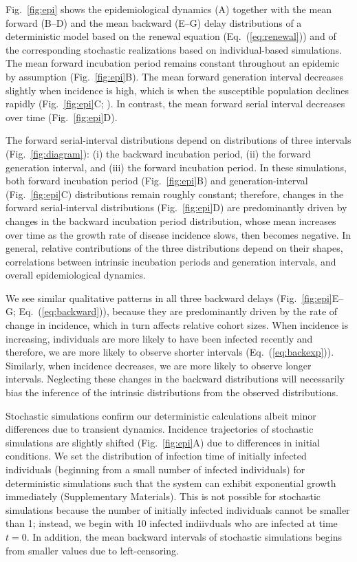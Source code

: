 \documentclass[12pt]{article}
\newcommand{\eref}[1]{Eq.~(\ref{eq:#1})}
\newcommand{\fref}[1]{Fig.~\ref{fig:#1}}
\begin{document}
\fref{epi} shows the epidemiological dynamics (A) together with the mean forward (B--D) and the mean backward (E--G) delay distributions of a deterministic model based on the renewal equation (\eref{renewal}) and of the corresponding stochastic realizations based on individual-based simulations.
The mean forward incubation period remains constant throughout an epidemic by assumption (\fref{epi}B).
The mean forward generation interval decreases slightly when incidence is high, which is when the susceptible population declines rapidly (\fref{epi}C; \cite{kenah2008generation, champredon2015intrinsic}).
In contrast, the mean forward serial interval decreases over time (\fref{epi}D).

The forward serial-interval distributions depend on distributions of three intervals
(\fref{diagram}): (i) the backward incubation period, (ii) the forward generation interval, and (iii) the forward incubation period.
In these simulations, both forward incubation period (\fref{epi}B) and generation-interval (\fref{epi}C) distributions remain roughly constant;
therefore, changes in the forward serial-interval distributions (\fref{epi}D) are predominantly driven by changes in the backward incubation period distribution, whose mean increases over time as the growth rate of disease incidence slows, then becomes negative.
In general, relative contributions of the three distributions depend on their shapes, correlations between intrinsic incubation periods and generation intervals, and overall epidemiological dynamics.

We see similar qualitative patterns in all three backward delays (\fref{epi}E--G; \eref{backward}), because they are predominantly driven by the rate of change in incidence, which in turn affects relative cohort sizes.
When incidence is increasing, individuals are more likely to have been infected recently and therefore, we are more likely to observe shorter intervals (\eref{backexp}).
Similarly, when incidence decreases, we are more likely to observe longer intervals.
Neglecting these changes in the backward distributions will necessarily bias the inference of the intrinsic distributions from the observed distributions.

Stochastic simulations confirm our deterministic calculations albeit minor differences due to transient dynamics.
Incidence trajectories of stochastic simulations are slightly shifted (\fref{epi}A) due to differences in initial conditions. 
We set the distribution of infection time of initially infected individuals (beginning from a small number of infected individuals) for deterministic simulations such that the system can exhibit exponential growth immediately (Supplementary Materials).
This is not possible for stochastic simulations because the number of initially infected individuals cannot be smaller than 1; instead, we begin with 10 infected indiivduals who are infected at time $t=0$.
In addition, the mean backward intervals of stochastic simulations begins from smaller values due to left-censoring.
\end{document}
